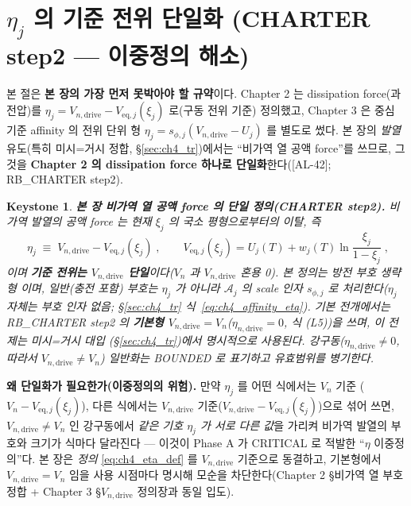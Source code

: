 \documentclass[11pt,a4paper]{article}
\newtheorem*{keybox}{Keystone}
\newcommand{\eq}{\mathrm{eq}}
\newcommand{\drive}{\mathrm{drive}}
\newcommand{\AL}[1]{\textsf{[AL-#1]}}
\begin{document}
\section{$\eta_j$ 의 기준 전위 단일화 (CHARTER step2 — 이중정의 해소)}\label{sec:ch4_eta_single}
본 절은 \textbf{본 장의 가장 먼저 못박아야 할 규약}이다. Chapter 2 는 dissipation force(과전압)를
$\eta_j=V_{n,\drive}-V_{\eq,j}(\xi_j)$ 로(구동 전위 기준) 정의했고, Chapter 3 은 중심 기준 affinity 의
전위 단위 형 $\eta_j=s_{\phi,j}(V_{n,\drive}-U_j)$ 를 별도로 썼다. 본 장의 \emph{발열} 유도(특히 미시=거시
정합, \S\ref{sec:ch4_tr})에서는 ``비가역 열 공액 force''를 쓰므로, 그것을 \textbf{Chapter 2 의 dissipation
force 하나로 단일화}한다(\AL{42}; RB\_CHARTER step2).
\begin{keybox}
\textbf{본 장 비가역 열 공액 force 의 단일 정의(CHARTER step2).} 비가역 발열의 공액 force 는 \emph{현재}
$\xi_j$ 의 국소 평형으로부터의 이탈, 즉
\begin{equation}
\boxed{\;\eta_j\;\equiv\;V_{n,\drive}-V_{\eq,j}(\xi_j)\;,\qquad V_{\eq,j}(\xi_j)=U_j(T)+w_j(T)\ln\frac{\xi_j}{1-\xi_j}\;,}
\label{eq:ch4_eta_def}
\end{equation}
이며 \textbf{기준 전위는 $V_{n,\drive}$ 단일}이다($V_n$ 과 $V_{n,\drive}$ 혼용 0). 본 정의는 방전 부호 생략형
이며, 일반(충전 포함) 부호는 $\eta_j$ 가 아니라 $\mathcal A_j$ 의 scale 인자 $s_{\phi,j}$ 로 처리한다($\eta_j$ 자체는
부호 인자 없음; \S\ref{sec:ch4_tr} 식~\eqref{eq:ch4_affinity_eta}). 기본 전개에서는 RB\_CHARTER
step2 의 \textbf{기본형 $V_{n,\drive}=V_n$}($\eta_{n,\drive}=0$, 식 (L5))을 쓰며, 이 전제는 미시=거시 대입
(\S\ref{sec:ch4_tr})에서 \emph{명시적으로} 사용된다. 강구동($\eta_{n,\drive}\ne0$, 따라서 $V_{n,\drive}\ne V_n$)
일반화는 BOUNDED 로 표기하고 유효범위를 병기한다.
\end{keybox}
\textbf{왜 단일화가 필요한가(이중정의의 위험).} 만약 $\eta_j$ 를 어떤 식에서는 $V_n$ 기준
($V_n-V_{\eq,j}(\xi_j)$), 다른 식에서는 $V_{n,\drive}$ 기준($V_{n,\drive}-V_{\eq,j}(\xi_j)$)으로 섞어 쓰면,
$V_{n,\drive}\ne V_n$ 인 강구동에서 \emph{같은 기호 $\eta_j$ 가 서로 다른 값}을 가리켜 비가역 발열의 부호와
크기가 식마다 달라진다 — 이것이 Phase A 가 CRITICAL 로 적발한 ``$\eta$ 이중정의''다. 본 장은 \emph{정의}
\eqref{eq:ch4_eta_def} 를 $V_{n,\drive}$ 기준으로 동결하고, 기본형에서 $V_{n,\drive}=V_n$ 임을 사용 시점마다
명시해 모순을 차단한다(Chapter 2 \S 비가역 열 부호 정합 + Chapter 3 \S$V_{n,\drive}$ 정의장과 동일 입도).
\end{document}
